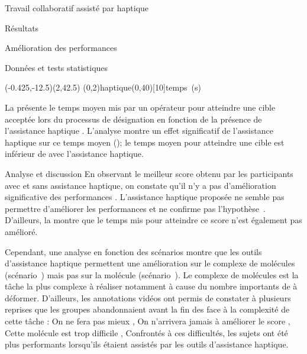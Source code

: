 \documentclass[myfrancais,ngerman,english,french]{mythesis}
\begin{document}
\begin{mychapter}{Travail collaboratif assisté par haptique}
\begin{mysection}{Résultats}
\begin{mysubsection}{Amélioration des performances}
\begin{mysubsubsection}{Données et tests statistiques}
					\begin{myfigure}
						\begin{myps}(-0.425,-12.5)(2,42.5)
							\myaxes(0,2){haptique}(0,40)[10]{temps~(s)}
						\end{myps}
					\end{myfigure}

					La  présente le temps moyen mis par un opérateur pour atteindre une cible acceptée lors du processus de désignation  en fonction de la présence de l'assistance haptique .
					L'analyse montre un effet significatif de l'assistance haptique  sur ce temps moyen  (); le temps moyen pour atteindre une cible est inférieur de  avec l'assistance haptique.
				\end{mysubsubsection}
				\begin{mysubsubsection}{Analyse et discussion}
					En observant le meilleur score  obtenu par les participants avec et sans assistance haptique, on constate qu'il n'y a pas d'amélioration significative des performances .
					L'assistance haptique proposée ne semble pas permettre d'améliorer les performances et ne confirme pas l'hypothèse~.
					D'ailleurs, la  montre que le temps mis pour atteindre ce score n'est également pas amélioré.

					Cependant, une analyse en fonction des scénarios montre que les outils d'assistance haptique permettent une amélioration sur le complexe de molécules \myNusENusG (scénario~) mais pas sur la molécule \myUbiquitin (scénario~).
					Le complexe de molécules \myNusENusG est la tâche la plus complexe à réaliser notamment à cause du nombre importants de  à déformer.
					D'ailleurs, les annotations vidéos ont permis de constater à plusieurs reprises que les groupes abandonnaient avant la fin des  face à la complexité de cette tâche : \og On ne fera pas mieux \fg, \og On n'arrivera jamais à améliorer le score \fg, \og Cette molécule est trop difficile \fg, \myetc
					Confrontés à ces difficultés, les sujets ont été plus performants lorsqu'ils étaient assistés par les outils d'assistance haptique.


\end{mysubsubsection}
\end{mysubsection}
\end{mysection}
\end{mychapter}
\end{document}
